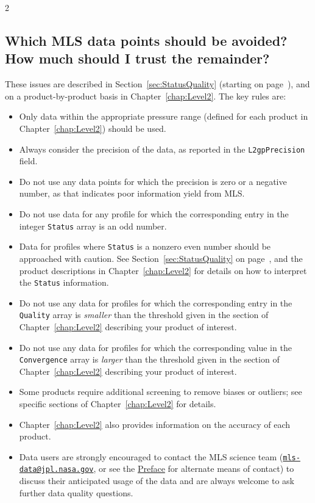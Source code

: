 \begin{multicols}{2}
  \subsection*{Which MLS data points should be avoided?  How much should I trust
    the remainder?}

  These issues are described in Section~\ref{sec:StatusQuality} (starting on page~\pageref{sec:StatusQuality}), and on a product-by-product basis in Chapter~\ref{chap:Level2}. The key rules are:
  \begin{itemize}[leftmargin=2ex, itemsep=2pt]
    \item Only data within the appropriate pressure range (defined for each product in Chapter~\ref{chap:Level2}) should be used.
    \item Always consider the precision of the data, as reported in the \texttt{L2gpPrecision} field.
    \item Do not use any data points for which the precision is zero or a negative number, as that indicates poor information yield from MLS.
    \item Do not use data for any profile for which the corresponding entry in the integer \texttt{Status} array is an odd number.
    \item Data for profiles where \texttt{Status} is a nonzero even number should be approached with caution. See Section~\ref{sec:StatusQuality} on page~\pageref{sec:StatusQuality}, and the product descriptions in Chapter~\ref{chap:Level2} for details on how to interpret the \texttt{Status} information.
    \item Do not use any data for profiles for which the corresponding entry in the \texttt{Quality} array is \emph{smaller} than the threshold given in the section of Chapter~\ref{chap:Level2} describing your product of interest.
    \item Do not use any data for profiles for which the corresponding value in the \texttt{Convergence} array is \emph{larger} than the threshold given in the section of Chapter~\ref{chap:Level2} describing your product of interest.
    \item Some products require additional screening to remove biases or outliers; see specific sections of Chapter~\ref{chap:Level2} for details.
    \item Chapter~\ref{chap:Level2} also provides information on the accuracy of each product.
    \item Data users are strongly encouraged to contact the MLS science team (\href{mailto:mls-data@jpl.nasa.gov}{\texttt{mls-data@jpl.nasa.gov}}, or see the \hyperref[chap:Preface]{Preface} for alternate means of contact) to discuss their anticipated usage of the data and are always welcome to ask further data quality questions.
  \end{itemize}


\end{multicols}

